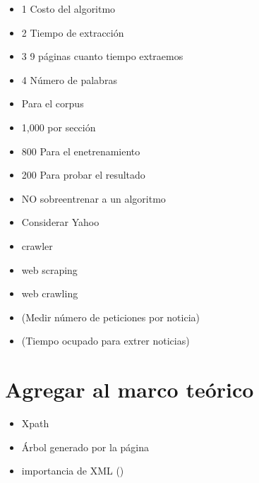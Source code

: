 \begin{itemize}

	\item 1 Costo del algoritmo
	\item 2 Tiempo de extracción
	\item 3 9 páginas cuanto tiempo extraemos
	\item 4 Número de palabras



	\item Para el corpus 
	\item 	1,000 por sección
	\item 		800 Para el enetrenamiento
	\item 		200 Para probar el resultado

	\item NO sobreentrenar a un algoritmo

	\item Considerar Yahoo

	\item crawler
	\item web scraping
	\item web crawling

	\item (Medir número de peticiones por noticia)
	\item (Tiempo ocupado para extrer noticias)

\end{itemize}

\section{Agregar al marco teórico}

	\begin{itemize}
		\item Xpath
		\item Árbol generado por la página
		\item importancia de XML ()
	\end{itemize}	

